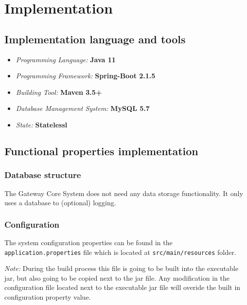 \documentclass[a4paper]{arrowhead}
\begin{document}
\newpage

\section{Implementation}
\label{sec:implementation}

\subsection {Implementation language and tools}

\begin{itemize}
\item \emph{Programming Language:} \textbf{Java 11}
\item \emph{Programming Framework:} \textbf{Spring-Boot 2.1.5}
\item \emph{Building Tool:} \textbf{Maven 3.5+}
\item \emph{Database Management System:} \textbf{MySQL 5.7}
\item \emph{State:} \textbf{Statelessl}
\end{itemize} 

\subsection {Functional properties implementation}

\subsubsection{Database structure}

The Gateway Core System does not need any data storage functionality. It only uses a database to (optional) logging.

\subsubsection{Configuration}
The system configuration properties can be found in the \texttt{application.properties} file which is located at \texttt{src/main/resources} folder.

\textit{Note:} During the build process this file is going to be built into the executable jar, but also going to be copied next to the jar file. Any modification in the configuration file located next to the executable jar file will overide the built in configuration property value.
\end{document}
